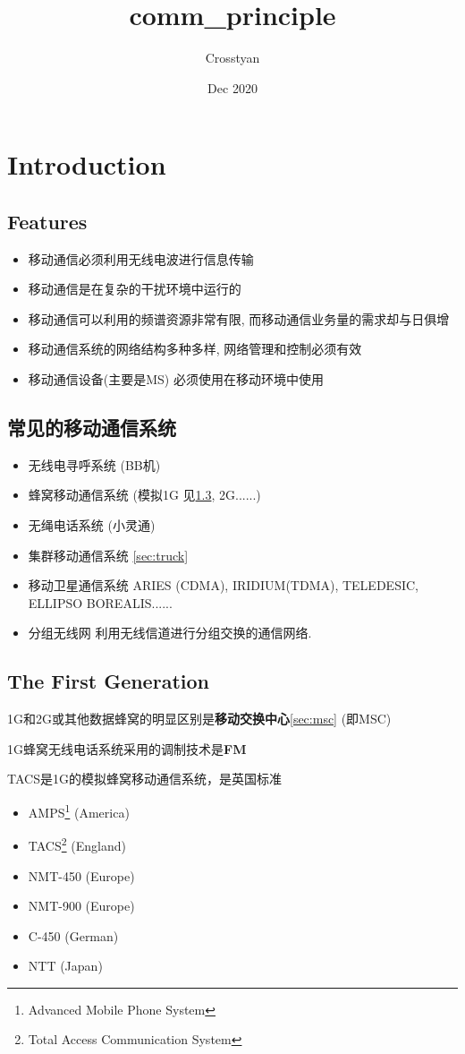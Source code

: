 \documentclass[a4paper]{report}
\title{comm_principle}
\author{Crosstyan}
\date{Dec 2020}
\begin{document}
\tableofcontents
\chapter{Introduction}
\section{Features}
\begin{itemize}
	\item 移动通信必须利用无线电波进行信息传输
	\item 移动通信是在复杂的干扰环境中运行的
	\item 移动通信可以利用的频谱资源非常有限, 而移动通信业务量的需求却与日俱增
	\item 移动通信系统的网络结构多种多样, 网络管理和控制必须有效
	\item 移动通信设备(主要是MS) 必须使用在移动环境中使用
\end{itemize}
\section{常见的移动通信系统}
\begin{itemize}
	\item 无线电寻呼系统 (BB机)
	\item 蜂窝移动通信系统 (模拟1G 见\ref{sec:1g}, 2G......)
	\item 无绳电话系统 (小灵通)
	\item 集群移动通信系统 \ref{sec:truck}
	\item 移动卫星通信系统
	\subitem ARIES (CDMA), IRIDIUM(TDMA), TELEDESIC, ELLIPSO BOREALIS......
	\item 分组无线网
	\subitem 利用无线信道进行分组交换的通信网络. 
\end{itemize}
\section{The First Generation}
\label{sec:1g}
1G和2G或其他数据蜂窝的明显区别是\textbf{移动交换中心}\ref{sec:msc} (即MSC)

1G蜂窝无线电话系统采用的调制技术是\textbf{FM}

TACS是1G的模拟蜂窝移动通信系统，是英国标准
\begin{itemize}
	\item AMPS\footnote{Advanced Mobile Phone System​} (America)
	\item TACS\footnote{Total Access Communication System} (England)
	\item NMT-450 (Europe)
	\item NMT-900 (Europe)
	\item C-450 (German)
	\item NTT (Japan)
\end{itemize}
\end{document}
